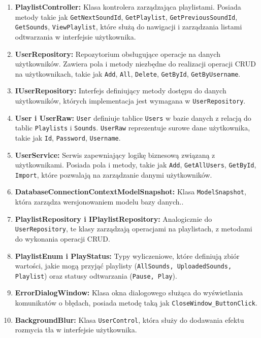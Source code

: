 \begin{enumerate}
    \item \textbf{ PlaylistController:} Klasa kontrolera zarządzająca playlistami. Posiada metody takie jak \newline \texttt{GetNextSoundId}, \texttt{GetPlaylist}, \texttt{GetPreviousSoundId}, \texttt{GetSounds}, \texttt{ViewPlaylist}, które służą do nawigacji i zarządzania listami odtwarzania w interfejsie użytkownika.
    \item \textbf{ UserRepository:} Repozytorium obsługujące operacje na danych użytkowników. Zawiera pola i metody niezbędne do realizacji operacji CRUD na użytkownikach, takie jak \texttt{Add}, \texttt{All}, \texttt{Delete}, \texttt{GetById}, \texttt{GetByUsername}.
    \item \textbf{ IUserRepository:}  Interfejs definiujący metody dostępu do danych użytkowników, których implementacja jest wymagana w \texttt{UserRepository}.
    \item \textbf{ User i UserRaw:} \texttt{User} definiuje tablice \texttt{Users} w bazie danych z relacją do tablic \texttt{Playlists} i \texttt{Sounds}. \texttt{UserRaw} reprezentuje surowe dane użytkownika, takie jak \texttt{Id}, \texttt{Password}, \texttt{Username}.
    \item \textbf{ UserService:} Serwis zapewniający logikę biznesową związaną z użytkownikami. Posiada pola i metody, takie jak \texttt{Add}, \texttt{GetAllUsers}, \texttt{GetById}, \texttt{Import}, które pozwalają na zarządzanie danymi użytkowników.
    \item \textbf{ DatabaseConnectionContextModelSnapshot:} Klasa \texttt{ModelSnapshot}, która zarządza wersjonowaniem modelu bazy danych..
    \item \textbf{ PlaylistRepository i IPlaylistRepository:}  Analogicznie do \texttt{UserRepository}, te klasy zarządzają operacjami na playlistach, z metodami do wykonania operacji CRUD.
    \item \textbf{ PlaylistEnum i PlayStatus:}  Typy wyliczeniowe, które definiują zbiór wartości, jakie mogą przyjąć playlisty (\texttt{AllSounds, UploadedSounds, Playlist}) oraz statusy odtwarzania (\texttt{Pause, Play}).
    \item \textbf{ ErrorDialogWindow:}  Klasa okna dialogowego służąca do wyświetlania komunikatów o błędach, posiada metodę taką jak \texttt{CloseWindow\_ButtonClick}.
    \item \textbf{ BackgroundBlur:}  Klasa \texttt{UserControl}, która służy do dodawania efektu rozmycia tła w interfejsie użytkownika.
\end{enumerate}

